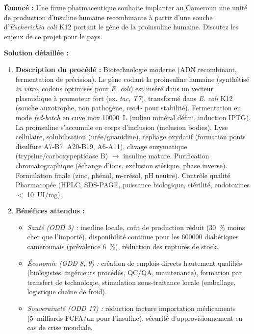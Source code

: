 \documentclass[11pt]{article}
\newcommand{\cle}[1]{{\popxbold\color{popdark}#1}}
\begin{document}
\begin{exoresolu}
\textbf{Énoncé :} Une firme pharmaceutique souhaite implanter au Cameroun une unité de production d'insuline humaine recombinante à partir d'une souche d'\emph{Escherichia coli} K12 portant le gène de la proinsuline humaine. Discutez les enjeux de ce projet pour le pays.

\textbf{Solution détaillée :}
\begin{enumerate}
    \item \textbf{Description du procédé :} Biotechnologie moderne (ADN recombinant, fermentation de précision). Le gène codant la proinsuline humaine (synthétisé \emph{in vitro}, codons optimisés pour \emph{E. coli}) est inséré dans un vecteur plasmidique à promoteur fort (ex. \emph{tac}, \emph{T7}), transformé dans \emph{E. coli} K12 (souche auxotrophe, non pathogène, \emph{recA-} pour stabilité). Fermentation en mode \emph{fed-batch} en cuve inox \SI{10000}{L} (milieu minéral défini, induction IPTG). La proinsuline s'accumule en \cle{corps d'inclusion} (inclusion bodies). Lyse cellulaire, solubilisation (urée/guanidine), repliage oxydatif (formation ponts disulfure A7-B7, A20-B19, A6-A11), clivage enzymatique (trypsine/carboxypeptidase B) $\rightarrow$ insuline mature. Purification chromatographique (échange d'ions, exclusion stérique, phase inverse). Formulation finale (zinc, phénol, m-crésol, pH neutre). Contrôle qualité Pharmacopée (HPLC, SDS-PAGE, puissance biologique, stérilité, endotoxines $<$ \SI{10}{UI/mg}).
    \item \textbf{Bénéfices attendus :} 
    \begin{itemize}
        \item \textit{Santé (ODD 3) :} insuline locale, coût de production réduit (\approx \SI{30}{\percent} moins cher que l'importé), disponibilité continue pour les \approx \num{600000} diabétiques camerounais (prévalence \approx \SI{6}{\percent}), réduction des ruptures de stock.
        \item \textit{Économie (ODD 8, 9) :} création de  emplois directs hautement qualifiés (biologistes, ingénieurs procédés, QC/QA, maintenance), formation par transfert de technologie, stimulation sous-traitance locale (emballage, logistique chaîne de froid).
        \item \textit{Souveraineté (ODD 17) :} réduction facture importation médicaments (\approx \SI{5}{milliards} FCFA/an pour l'insuline), sécurité d'approvisionnement en cas de crise mondiale.

\end{itemize}
\end{enumerate}
\end{exoresolu}
\end{document}
